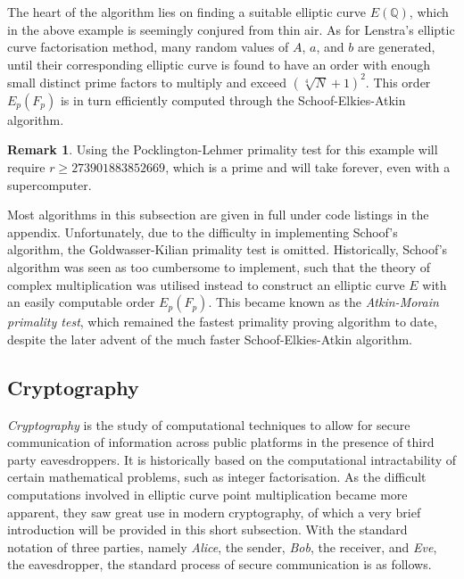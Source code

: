 \documentclass{article}
\newcommand{\Q}{\mathbb{Q}}
\newcommand{\rb}[1]{\left( #1 \right)}
\theoremstyle{definition}
\newtheorem*{remark}{Remark}
\begin{document}
The heart of the algorithm lies on finding a suitable elliptic curve $ E\rb{\Q} $, which in the above example is seemingly conjured from thin air. As for Lenstra's elliptic curve factorisation method, many random values of $ A $, $ a $, and $ b $ are generated, until their corresponding elliptic curve is found to have an order with enough small distinct prime factors to multiply and exceed $ \rb{\sqrt[4]{N} + 1}^2 $. This order $ E_p\rb{F_p} $ is in turn efficiently computed through the Schoof-Elkies-Atkin algorithm.

\begin{remark}
Using the Pocklington-Lehmer primality test for this example will require $ r \ge 273901883852669 $, which is a prime and will take forever, even with a supercomputer.
\end{remark}

Most algorithms in this subsection are given in full under code listings in the appendix. Unfortunately, due to the difficulty in implementing Schoof's algorithm, the Goldwasser-Kilian primality test is omitted. Historically, Schoof's algorithm was seen as too cumbersome to implement, such that the theory of complex multiplication was utilised instead to construct an elliptic curve $ E $ with an easily computable order $ E_p\rb{F_p} $. This became known as the \emph{Atkin-Morain primality test}, which remained the fastest primality proving algorithm to date, despite the later advent of the much faster Schoof-Elkies-Atkin algorithm.

\pagebreak

\subsection{Cryptography}

\emph{Cryptography} is the study of computational techniques to allow for secure communication of information across public platforms in the presence of third party eavesdroppers. It is historically based on the computational intractability of certain mathematical problems, such as integer factorisation. As the difficult computations involved in elliptic curve point multiplication became more apparent, they saw great use in modern cryptography, of which a very brief introduction will be provided in this short subsection. With the standard notation of three parties, namely \emph{Alice}, the sender, \emph{Bob}, the receiver, and \emph{Eve}, the eavesdropper, the standard process of secure communication is as follows.
\end{document}
